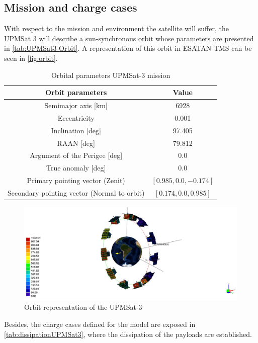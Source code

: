 \subsection{Mission and charge cases}
With respect to the mission and environment the satellite will suffer, the UPMSat 3 will describe a sun-synchronous orbit whose parameters are presented in \autoref{tab:UPMSat3-Orbit}. A representation of this orbit in ESATAN-TMS can be seen in  \autoref{fig:orbit}.
\begin{table}[H]
    \centering
    \caption{Orbital parameters UPMSat-3 mission}
    \label{tab:UPMSat3-Orbit}
    \begin{tabular}{c c}
    \toprule
    \multicolumn{1}{c}{\textbf{Orbit parameters}} & \multicolumn{1}{c}{\textbf{Value}} \\ \midrule
    Semimajor axis [km] & 6928 \\
    Eccentricity & 0.001 \\
    Inclination [deg] & 97.405 \\
    RAAN [deg] & 79.812 \\
    Argument of the Perigee [deg] & 0.0 \\
    True anomaly [deg] & 0.0 \\
    Primary pointing vector (Zenit) & {$[0.985,0.0,-0.174]$} \\
    Secondary pointing vector (Normal to orbit) & {$[0.174,0.0,0.985]$} \\
    \bottomrule
    \end{tabular}
    \end{table}
\begin{figure}[H]
    \centering
    \includegraphics[width = \textwidth]{Figures/UPMSat3/orbit.jpg}
    \caption{Orbit representation of the UPMSat-3}
    \label{fig:orbit}
\end{figure}
Besides, the charge cases defined for the model are exposed in \autoref{tab:dissipationUPMSat3}, where the dissipation of the payloads are established. 
